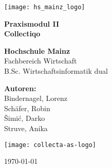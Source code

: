 \begin{titlepage}
    \centering
    \vspace*{1cm}

    \texttt{[image: hs\_mainz\_logo]}\\
    \vspace{1.5cm}

    \textbf{\LARGE Praxismodul II}\\
    \vspace{0.5cm}
    \textbf{\Large Collectiqo}\\
    \vspace{1.5cm}

    \textbf{Hochschule Mainz}\\
    \vspace{0.5cm}
    Fachbereich Wirtschaft\\
    \vspace{0.5cm}
    B.Sc. Wirtschaftsinformatik dual\\
    \vspace{1.5cm}

    \textbf{Autoren:}\\
    Bindernagel, Lorenz\\
    Schäfer, Robin\\
    Šimić, Darko\\
    Struve, Anika\\

    \vspace{1.5cm}
    
    \texttt{[image: collecta-as-logo]}\\
    \vfill

    \today
\end{titlepage}